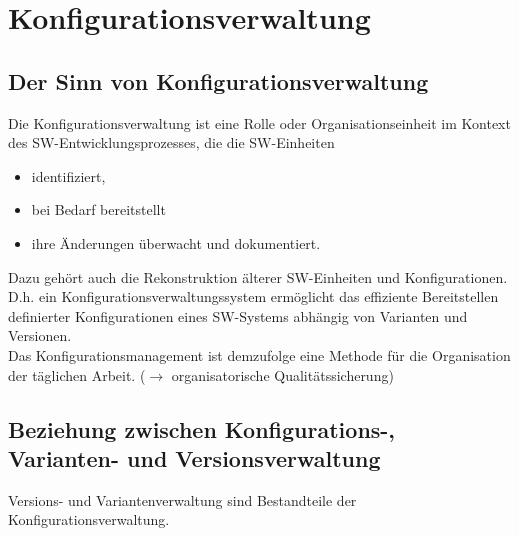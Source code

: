 \chapter{Konfigurationsverwaltung}

\section{Der Sinn von Konfigurationsverwaltung}
Die Konfigurationsverwaltung ist eine Rolle oder Organisationseinheit im Kontext des SW-Ent\-wick\-lungs\-prozesses, die die SW-Einheiten
\begin{itemize}
\item identifiziert,
\item bei Bedarf bereitstellt
\item ihre Änderungen überwacht und dokumentiert.
\end{itemize}
Dazu gehört auch die Rekonstruktion älterer SW-Einheiten und Konfigurationen.\\
D.h. ein Konfigurationsverwaltungssystem ermöglicht das effiziente Bereitstellen definierter
Konfigurationen eines SW-Systems abhängig von Varianten und Versionen.\\
Das Konfigurationsmanagement ist demzufolge eine Methode für die Organisation der täglichen
Arbeit. ($\to$ organisatorische Qualitätssicherung)

\section{Beziehung zwischen Konfigurations-, Varianten- und Versionsverwaltung}
Versions- und Variantenverwaltung sind Bestandteile der Konfigurationsverwaltung.

